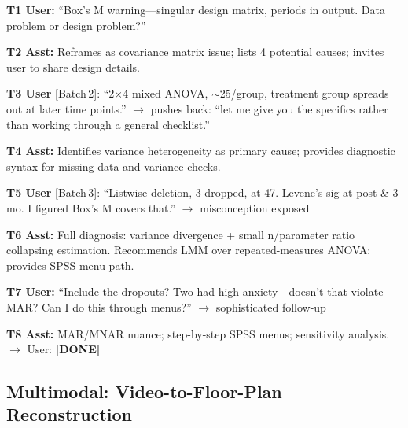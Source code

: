 \documentclass{article}
\begin{document}
\begin{tcolorbox}[colback=gray!3, colframe=gray!50, fonttitle=\bfseries\small,
  title={\small Statistical Analysis SPSS \;$\mid$\; Simulated User: Claude Opus 4.6}]
\begin{minipage}[t]{0.54\linewidth}
\smallskip
{\scriptsize
\textbf{T1 User:} ``Box's M warning---singular design matrix, periods in output. Data problem or design problem?''

\textbf{T2 Asst:} Reframes as covariance matrix issue; lists 4 potential causes; invites user to share design details.

\textbf{T3 User} {\color{blue!70}[Batch\,2]}: ``2$\times$4 mixed ANOVA, ${\sim}$25/group, treatment group spreads out at later time points.'' $\to$ pushes back: ``let me give you the specifics rather than working through a general checklist.''

\textbf{T4 Asst:} Identifies variance heterogeneity as primary cause; provides diagnostic syntax for missing data and variance checks.

\textbf{T5 User} {\color{blue!70}[Batch\,3]}: ``Listwise deletion, 3 dropped, at 47. Levene's sig at post \& 3-mo. I figured Box's M covers that.'' $\to$ misconception exposed

\textbf{T6 Asst:} Full diagnosis: variance divergence + small n/parameter ratio collapsing estimation. Recommends LMM over repeated-measures ANOVA; provides SPSS menu path.

\textbf{T7 User:} ``Include the dropouts? Two had high anxiety---doesn't that violate MAR?  Can I do this through menus?'' $\to$ sophisticated follow-up

\textbf{T8 Asst:} MAR/MNAR nuance; step-by-step SPSS menus; sensitivity analysis.  $\to$ User: \textbf{[DONE]}
}
\end{minipage}
\end{tcolorbox}
\label{tab:case-c18en}
\subsection{Multimodal: Video-to-Floor-Plan Reconstruction}
\label{sec:case-m031}
\end{document}
